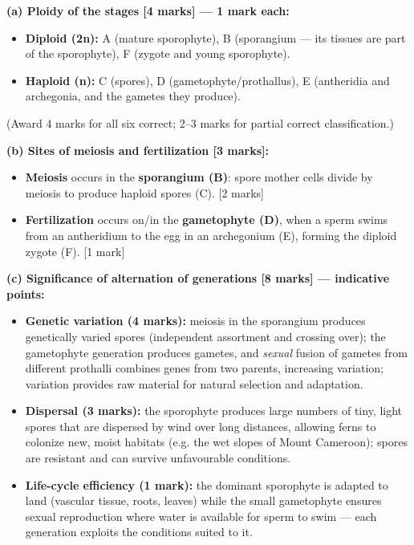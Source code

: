 \documentclass[11pt]{article}
\begin{document}
\begin{corrige}
\textbf{(a) Ploidy of the stages [4 marks] — 1 mark each:}
\begin{itemize}
\item \textbf{Diploid (2n):} A (mature sporophyte), B (sporangium — its tissues are part of the sporophyte), F (zygote and young sporophyte).
\item \textbf{Haploid (n):} C (spores), D (gametophyte/prothallus), E (antheridia and archegonia, and the gametes they produce).
\end{itemize}
(Award 4 marks for all six correct; 2–3 marks for partial correct classification.)

\textbf{(b) Sites of meiosis and fertilization [3 marks]:}
\begin{itemize}
\item \textbf{Meiosis} occurs in the \textbf{sporangium (B)}: spore mother cells divide by meiosis to produce haploid spores (C). [2 marks]
\item \textbf{Fertilization} occurs on/in the \textbf{gametophyte (D)}, when a sperm swims from an antheridium to the egg in an archegonium (E), forming the diploid zygote (F). [1 mark]
\end{itemize}

\textbf{(c) Significance of alternation of generations [8 marks] — indicative points:}
\begin{itemize}
\item \textbf{Genetic variation (4 marks):} meiosis in the sporangium produces genetically varied spores (independent assortment and crossing over); the gametophyte generation produces gametes, and \emph{sexual} fusion of gametes from different prothalli combines genes from two parents, increasing variation; variation provides raw material for natural selection and adaptation.
\item \textbf{Dispersal (3 marks):} the sporophyte produces large numbers of tiny, light spores that are dispersed by wind over long distances, allowing ferns to colonize new, moist habitats (e.g. the wet slopes of Mount Cameroon); spores are resistant and can survive unfavourable conditions.
\item \textbf{Life-cycle efficiency (1 mark):} the dominant sporophyte is adapted to land (vascular tissue, roots, leaves) while the small gametophyte ensures sexual reproduction where water is available for sperm to swim — each generation exploits the conditions suited to it.
\end{itemize}
\end{corrige}
\end{document}
